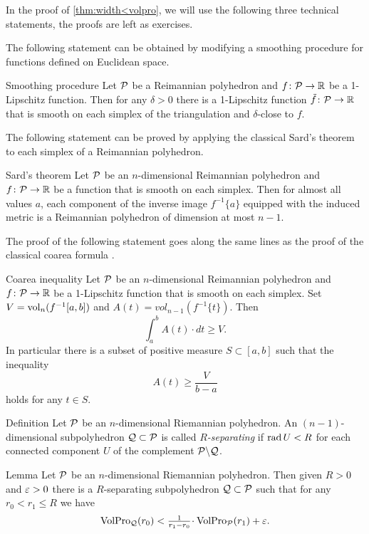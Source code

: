 In the proof of \ref{thm:width<volpro}, we will use the following three technical statements,
the proofs are left as exercises.

The following statement can be obtained by modifying a smoothing procedure for functions defined on Euclidean space.  

\begin{thm}{Smoothing procedure}
Let $\mathcal{P}$ be a Reimannian polyhedron and $f\colon\mathcal{P}\to \mathbb{R}$ be a 1-Lipschitz function.
Then for any $\delta>0$ there is a  1-Lipschitz function $\tilde f\colon\mathcal{P}\to \mathbb{R}$ that is smooth on each simplex of the triangulation and $\delta$-close to $f$.
\end{thm}

The following statement can be proved by applying the classical Sard's theorem to each simplex of a Reimannian polyhedron.

\begin{thm}{Sard's theorem}
Let $\mathcal{P}$ be an $n$-dimensional Reimannian polyhedron and $f\colon\mathcal{P}\to \mathbb{R}$ be a function that is smooth on each simplex.
Then for almost all values $a$, each component of the inverse image $f^{-1}\{a\}$ equipped with the induced metric is a Reimannian polyhedron of dimension at most $n-1$.
\end{thm}

The proof of the following statement goes along the same lines as the proof of the classical coarea formula \cite[3.2.11]{federer}. 

\begin{thm}{Coarea inequality}
Let $\mathcal{P}$ be an $n$-dimensional Reimannian polyhedron and $f\colon\mathcal{P}\to \mathbb{R}$ be a 1-Lipschitz function that is smooth on each simplex.
Set $V=\operatorname{\rm vol}\nolimits_n (f^{-1}[a,b])$ and $A(t)=vol_{n-1}(f^{-1}\{t\})$.
Then 
\[\int_a^bA(t)\cdot dt\ge V .\]
In particular there is a subset of positive measure $S\subset [a,b]$ such that the inequality 
\[A(t)\ge \frac V{b-a}\]
holds for any $t\in S$.
\end{thm}

\begin{thm}{Definition}
Let $\mathcal{P}$ be an $n$-dimensional Riemannian polyhedron.
An $(n-1)$-dimensional subpolyhedron $\mathcal{Q}\subset\mathcal{P}$ is called \emph{$R$-separating} if $\mathop{\rm rad}\nolimits U<R$ for each connected component $U$ of the complement $\mathcal{P}\backslash \mathcal{Q}$.
\end{thm}



\begin{thm}{Lemma}\label{lem:separating}
Let $\mathcal{P}$ be an $n$-dimensional Riemannian polyhedron.
Then given $R>0$ and $\varepsilon>0$ there is a $R$-separating subpolyhedron $\mathcal{Q}\subset\mathcal{P}$ such that for any $r_0<r_1\le R$ we have
\[\VolPro_{\spc{Q}}(r_0)< \tfrac1{r_1-r_0}\cdot \VolPro_{\spc{P}}(r_1)+\eps.\]

\end{thm}

